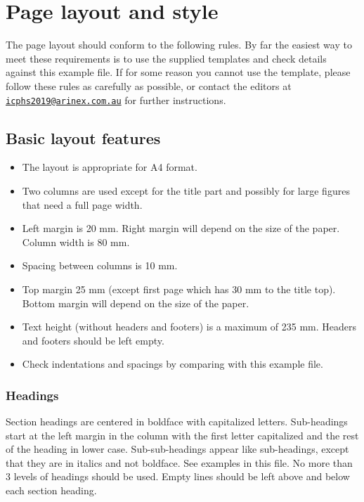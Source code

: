\documentclass[
  a4paper,
  11pt,
  twocolumn]{article}
\begin{document}
\section{Page layout and style}

The page layout should conform to the following rules. By far the
easiest way to meet these requirements is to use the supplied templates
and check details against this example file. If for some reason you
cannot use the template, please follow these rules as carefully as
possible, or contact the editors at
\href{mailto:icphs2019@arinex.com.au}{\nolinkurl{icphs2019@arinex.com.au}}
for further instructions.

\subsection{Basic layout features}

\begin{itemize}
  \item The layout is appropriate for A4 format.
  \item Two columns are used except for the title part and possibly for large 
  figures that need a full page width.
  \item Left margin is 20 mm. Right margin will depend on the size of the 
  paper. Column width is 80 mm.
  \item Spacing between columns is 10 mm.
  \item Top margin 25 mm (except first page which has 30 mm to the title top). 
  Bottom margin will depend on the size of the paper.
  \item Text height (without headers and footers) is a maximum of 235 mm. 
  Headers and footers should be left empty.
  \item Check indentations and spacings by comparing with this example file.
\end{itemize}

\subsubsection{Headings}

Section headings are centered in boldface with capitalized letters.
Sub-headings start at the left margin in the column with the first
letter capitalized and the rest of the heading in lower case.
Sub-sub-headings appear like sub-headings, except that they are in
italics and not boldface. See examples in this file. No more than 3
levels of headings should be used. Empty lines should be left above and
below each section heading.
\end{document}
